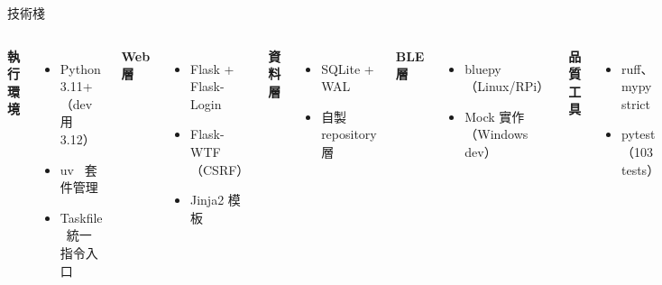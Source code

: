 \documentclass[10pt,aspectratio=169]{beamer}
\begin{document}
\begin{frame}{技術棧}
  \begin{columns}[T]
    \textbf{執行環境}
    \begin{itemize}
      \item Python 3.11+（dev 用 3.12）
      \item uv \, 套件管理
      \item Taskfile \, 統一指令入口
    \end{itemize}

    \textbf{Web 層}
    \begin{itemize}
      \item Flask + Flask-Login
      \item Flask-WTF（CSRF）
      \item Jinja2 模板
    \end{itemize}

    \textbf{資料層}
    \begin{itemize}
      \item SQLite + WAL
      \item 自製 repository 層
    \end{itemize}

    \textbf{BLE 層}
    \begin{itemize}
      \item bluepy（Linux/RPi）
      \item Mock 實作（Windows dev）
    \end{itemize}

    \textbf{品質工具}
    \begin{itemize}
      \item ruff、mypy strict
      \item pytest（103 tests）
    \end{itemize}
  \end{columns}
\end{frame}
\end{document}
